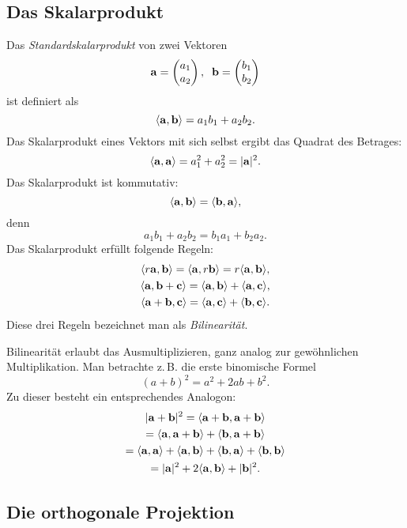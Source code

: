 \subsection{Das Skalarprodukt}

Das \emph{Standardskalarprodukt} von zwei Vektoren%
\[\mathbf{a} = \begin{pmatrix}a_1\\ a_2\end{pmatrix},\;\;
\mathbf{b} = \begin{pmatrix}b_1\\ b_2\end{pmatrix}\]
ist definiert als
\[\langle\mathbf{a},\mathbf{b}\rangle = a_1b_1+a_2b_2.\]
Das Skalarprodukt eines Vektors mit sich selbst
ergibt das Quadrat des Betrages:
\[\langle\mathbf{a},\mathbf{a}\rangle = a_1^2+a_2^2 = |\mathbf{a}|^2.\]
Das Skalarprodukt ist kommutativ:
\[\langle\mathbf{a},\mathbf{b}\rangle
= \langle\mathbf{b},\mathbf{a}\rangle,\]
denn
\[a_1 b_1 + a_2 b_2 = b_1 a_1 + b_2 a_2.\]
Das Skalarprodukt erfüllt folgende Regeln:
\begin{gather*}
\langle r\mathbf{a},\mathbf{b}\rangle = \langle\mathbf{a},r\mathbf{b}\rangle
= r\langle\mathbf{a},\mathbf{b}\rangle,\\
\langle\mathbf{a},\mathbf{b}+\mathbf{c}\rangle
= \langle\mathbf{a},\mathbf{b}\rangle+\langle\mathbf{a},\mathbf{c}\rangle,\\
\langle\mathbf{a}+\mathbf{b},\mathbf{c}\rangle
= \langle\mathbf{a},\mathbf{c}\rangle+\langle\mathbf{b},\mathbf{c}\rangle.
\end{gather*}
Diese drei Regeln bezeichnet man als \emph{Bilinearität}.

Bilinearität erlaubt das Ausmultiplizieren, ganz analog zur
gewöhnlichen Multiplikation. Man betrachte z.\,B. die
erste binomische Formel
\[(a+b)^2 = a^2+2ab+b^2.\]
Zu dieser besteht ein entsprechendes Analogon:
\begin{gather*}
|\mathbf{a}+\mathbf{b}|^2
= \langle\mathbf{a}+\mathbf{b},\mathbf{a}+\mathbf{b}\rangle\\
= \langle\mathbf{a},\mathbf{a}+\mathbf{b}\rangle
+ \langle\mathbf{b},\mathbf{a}+\mathbf{b}\rangle\\
= \langle\mathbf{a},\mathbf{a}\rangle
+ \langle\mathbf{a},\mathbf{b}\rangle
+ \langle\mathbf{b},\mathbf{a}\rangle
+ \langle\mathbf{b},\mathbf{b}\rangle\\
= |\mathbf{a}|^2 + 2\langle\mathbf{a},\mathbf{b}\rangle + |\mathbf{b}|^2.
\end{gather*}

\subsection{Die orthogonale Projektion}

